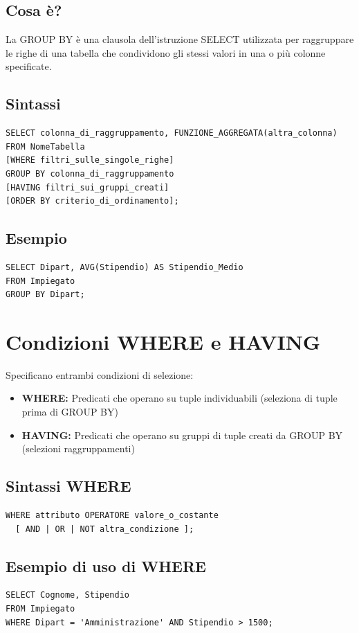 \subsection{Cosa è?}
La GROUP BY è una clausola dell'istruzione SELECT utilizzata per raggruppare le righe di una tabella che condividono gli stessi valori in una o più colonne specificate.
\subsection{Sintassi}
\begin{lstlisting}[language=sql_generic]
SELECT colonna_di_raggruppamento, FUNZIONE_AGGREGATA(altra_colonna)
FROM NomeTabella
[WHERE filtri_sulle_singole_righe]
GROUP BY colonna_di_raggruppamento
[HAVING filtri_sui_gruppi_creati]
[ORDER BY criterio_di_ordinamento];
\end{lstlisting}
\subsection{Esempio}
\begin{lstlisting}[language=sql_generic]
SELECT Dipart, AVG(Stipendio) AS Stipendio_Medio
FROM Impiegato
GROUP BY Dipart;
\end{lstlisting}

\section{Condizioni WHERE e HAVING}
Specificano entrambi condizioni di selezione:
\begin{itemize}
    \item \textbf{WHERE:} Predicati che operano su tuple individuabili (seleziona di tuple prima di GROUP BY)
    \item \textbf{HAVING:} Predicati che operano su gruppi di tuple creati da GROUP BY (selezioni raggruppamenti)
\end{itemize}

\subsection{Sintassi WHERE}
\begin{lstlisting}[language=sql_generic]
WHERE attributo OPERATORE valore_o_costante
  [ AND | OR | NOT altra_condizione ];
\end{lstlisting}

\subsection{Esempio di uso di WHERE}
\begin{lstlisting}[language=sql_generic]
SELECT Cognome, Stipendio
FROM Impiegato
WHERE Dipart = 'Amministrazione' AND Stipendio > 1500;
\end{lstlisting}

